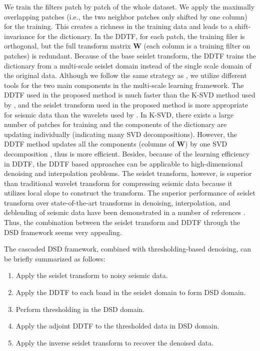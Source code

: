 We train the filters patch by patch of the whole dataset. We apply the maximally overlapping patches (i.e., the two neighbor patches only shifted by one column) for the training. This creates a richness in the training data and leads to a shift-invariance for the dictionary. In the DDTF, for each patch, the training filer is orthogonal, but the full transform matrix $\mathbf{W}$ (each column is a training filter on patches) is redundant. Because of the base seislet transform, the DDTF trains the dictionary from a multi-scale seislet domain instead of the single scale domain of the original data. Although we follow the same strategy as \cite{ophir2011}, we utilize different tools for the two main components in the multi-scale learning framework. The DDTF used in the proposed method is much faster than the K-SVD method used by \cite{ophir2011}, and the seislet transform used in the proposed method is more appropriate for seismic data than the wavelets used by \cite{ophir2011}. In K-SVD, there exists a large number of patches for training and the components of the dictionary are updating individually (indicating many SVD decompositions). However, the DDTF method updates all the components (columns of $\mathbf{W}$) by one SVD decomposition \cite[]{siwei2015}, thus is more efficient. Besides, because of the learning efficiency in DDTF, the DDTF based approaches can be applicable to high-dimensional denoising and interpolation problems. The seislet transform, however, is superior than traditional wavelet transform for compressing seismic data because it utilizes local slope to construct the transform. The superior performance of seislet transform over state-of-the-art transforms in denoising, interpolation, and deblending of seismic data have been demonstrated in a number of references \cite[]{fomel2010seislet,liuyang2010,yangkang20142,shuwei20153}. Thus, the combination between the seislet transform and DDTF through the DSD framework seems very appealing. 



The cascaded DSD framework, combined with thresholding-based denoising, can be briefly summarized as follows:
\begin{enumerate}
\item Apply the seislet transform to noisy seismic data.
\item Apply the DDTF to each band in the seislet domain to form DSD domain.
\item Perform thresholding in the DSD domain.
\item Apply the adjoint DDTF to the thresholded data in DSD domain.
\item Apply the inverse seislet transform to recover the denoised data.
\end{enumerate}

